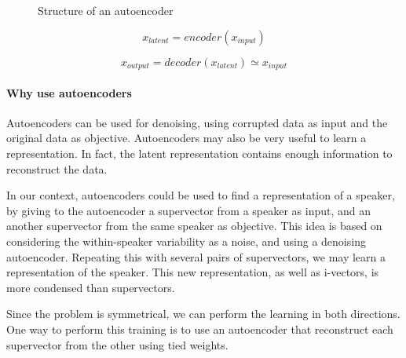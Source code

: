 \documentclass[conference]{IEEEtran}
\begin{document}
\begin{figure}[!h]


    \caption{Structure of an autoencoder}
    \label{autoencoder_structure}
\end{figure}


\begin{equation}
  x_{latent} = encoder(x_{input})
  \label{eq:enc}
\end{equation}

\begin{equation}
  x_{output} = decoder(x_{latent}) \simeq x_{input}
  \label{eq:dec}
\end{equation}


\paragraph{Why use autoencoders}

Autoencoders can be used for denoising, using corrupted data as input and the original data as objective.
Autoencoders may also be very useful to learn a representation. In fact, the latent representation contains enough information to reconstruct the data.

In our context, autoencoders could be used to find a representation of a speaker, by giving to the autoencoder a supervector from a speaker as input, and an another supervector from the same speaker as objective. This idea is based on considering the within-speaker variability as a noise, and using a denoising autoencoder. Repeating this with several pairs of supervectors, we may learn a representation of the speaker. This new representation, as well as i-vectors, is more condensed than supervectors.

Since the problem is symmetrical, we can perform the learning in both directions. One way to perform this training is to use an autoencoder that reconstruct each supervector from the other using tied weights.
\end{document}
